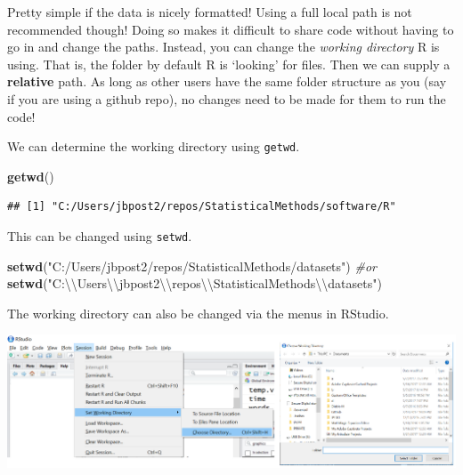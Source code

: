 \documentclass[
]{book}
\newenvironment{Shaded}{\begin{snugshade}}{\end{snugshade}}
\newcommand{\CharTok}[1]{\textcolor[rgb]{0.31,0.60,0.02}{#1}}
\newcommand{\CommentTok}[1]{\textcolor[rgb]{0.56,0.35,0.01}{\textit{#1}}}
\newcommand{\KeywordTok}[1]{\textcolor[rgb]{0.13,0.29,0.53}{\textbf{#1}}}
\newcommand{\NormalTok}[1]{#1}
\newcommand{\StringTok}[1]{\textcolor[rgb]{0.31,0.60,0.02}{#1}}
\theoremstyle{definition}
\theoremstyle{definition}
\theoremstyle{definition}
\theoremstyle{remark}
\begin{document}
Pretty simple if the data is nicely formatted! Using a full local path is not recommended though! Doing so makes it difficult to share code without having to go in and change the paths. Instead, you can change the \emph{working directory} R is using. That is, the folder by default R is `looking' for files. Then we can supply a \textbf{relative} path. As long as other users have the same folder structure as you (say if you are using a github repo), no changes need to be made for them to run the code!

We can determine the working directory using \texttt{getwd}.

\begin{Shaded}
\begin{Highlighting}[]
\KeywordTok{getwd}\NormalTok{()}
\end{Highlighting}
\end{Shaded}

\begin{verbatim}
## [1] "C:/Users/jbpost2/repos/StatisticalMethods/software/R"
\end{verbatim}

This can be changed using \texttt{setwd}.

\begin{Shaded}
\begin{Highlighting}[]
\KeywordTok{setwd}\NormalTok{(}\StringTok{"C:/Users/jbpost2/repos/StatisticalMethods/datasets"}\NormalTok{)}
\CommentTok{#or}
\KeywordTok{setwd}\NormalTok{(}\StringTok{"C:}\CharTok{\textbackslash{}\textbackslash{}}\StringTok{Users}\CharTok{\textbackslash{}\textbackslash{}}\StringTok{jbpost2}\CharTok{\textbackslash{}\textbackslash{}}\StringTok{repos}\CharTok{\textbackslash{}\textbackslash{}}\StringTok{StatisticalMethods}\CharTok{\textbackslash{}\textbackslash{}}\StringTok{datasets"}\NormalTok{)}
\end{Highlighting}
\end{Shaded}

The working directory can also be changed via the menus in RStudio.

\begin{center}\includegraphics[width=0.8\linewidth]{img/setwd} \end{center}
\end{document}
